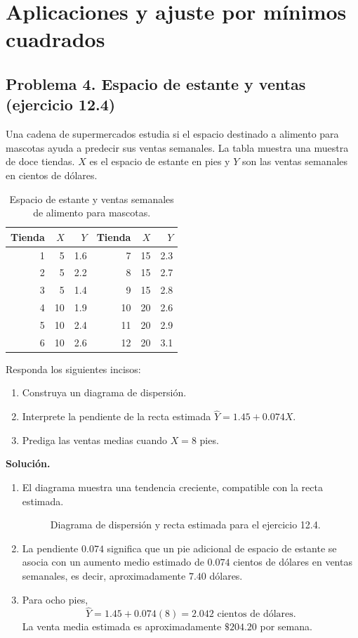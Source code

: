 \section{Aplicaciones y ajuste por mínimos cuadrados}

\subsection{Problema 4. Espacio de estante y ventas (ejercicio 12.4)}

Una cadena de supermercados estudia si el espacio destinado a alimento para mascotas ayuda a predecir sus ventas semanales. La tabla muestra una muestra de doce tiendas. $X$ es el espacio de estante en pies y $Y$ son las ventas semanales en cientos de dólares.

\begin{table}[H]
\centering
\small
\begin{tabular}{r|r r@{\qquad}r|r r}
\textbf{Tienda} & $X$ & $Y$ & \textbf{Tienda} & $X$ & $Y$ \\ \hline
1 & 5 & 1.6 & 7 & 15 & 2.3 \\
2 & 5 & 2.2 & 8 & 15 & 2.7 \\
3 & 5 & 1.4 & 9 & 15 & 2.8 \\
4 & 10 & 1.9 & 10 & 20 & 2.6 \\
5 & 10 & 2.4 & 11 & 20 & 2.9 \\
6 & 10 & 2.6 & 12 & 20 & 3.1 \\
\end{tabular}
\caption{Espacio de estante y ventas semanales de alimento para mascotas.}
\end{table}

Responda los siguientes incisos:
\begin{enumerate}
    \item[\textbf{a)}] Construya un diagrama de dispersión.
    \item[\textbf{b)}] Interprete la pendiente de la recta estimada $\widehat Y=1.45+0.074X$.
    \item[\textbf{c)}] Prediga las ventas medias cuando $X=8$ pies.
\end{enumerate}

\textbf{Solución.}
\begin{enumerate}
    \item[\textbf{a)}] El diagrama muestra una tendencia creciente, compatible con la recta estimada.
    \begin{figure}[H]
    \centering
    
    \caption{Diagrama de dispersión y recta estimada para el ejercicio 12.4.}
    \label{fig:clase4-petfood}
    \end{figure}
    \item[\textbf{b)}] La pendiente $0.074$ significa que un pie adicional de espacio de estante se asocia con un aumento medio estimado de $0.074$ cientos de dólares en ventas semanales, es decir, aproximadamente $7.40$ dólares.
    \item[\textbf{c)}] Para ocho pies,
    \[
    \widehat Y=1.45+0.074(8)=2.042\text{ cientos de dólares}.
    \]
    La venta media estimada es aproximadamente $\$204.20$ por semana.
\end{enumerate}

